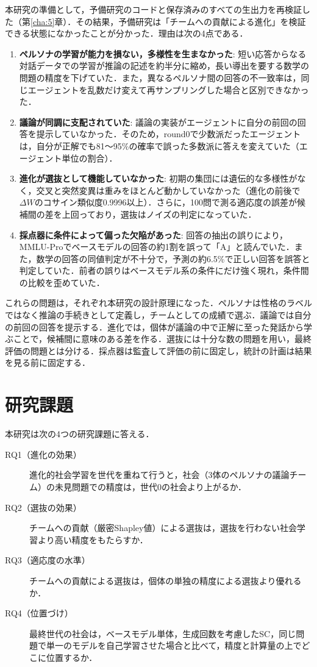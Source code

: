 本研究の準備として，予備研究のコードと保存済みのすべての生出力を再検証した（第\ref{cha:5}章）．その結果，予備研究は「チームへの貢献による進化」を検証できる状態になかったことが分かった．理由は次の4点である．
\begin{enumerate}
\item \textbf{ペルソナの学習が能力を損ない，多様性を生まなかった}: 短い応答からなる対話データでの学習が推論の記述を約半分に縮め，長い導出を要する数学の問題の精度を下げていた．また，異なるペルソナ間の回答の不一致率は，同じエージェントを乱数だけ変えて再サンプリングした場合と区別できなかった．
\item \textbf{議論が同調に支配されていた}: 議論の実装がエージェントに自分の前回の回答を提示していなかった．そのため，round0で少数派だったエージェントは，自分が正解でも81〜95\%の確率で誤った多数派に答えを変えていた（エージェント単位の割合）．
\item \textbf{進化が選抜として機能していなかった}: 初期の集団には遺伝的な多様性がなく，交叉と突然変異は重みをほとんど動かしていなかった（進化の前後で$\Delta W$のコサイン類似度0.9996以上）．さらに，100問で測る適応度の誤差が候補間の差を上回っており，選抜はノイズの判定になっていた．
\item \textbf{採点器に条件によって偏った欠陥があった}: 回答の抽出の誤りにより，MMLU-Proでベースモデルの回答の約1割を誤って「A」と読んでいた．また，数学の回答の同値判定が不十分で，予測の約6.5\%で正しい回答を誤答と判定していた．前者の誤りはベースモデル系の条件にだけ強く現れ，条件間の比較を歪めていた．
\end{enumerate}

これらの問題は，それぞれ本研究の設計原理になった．ペルソナは性格のラベルではなく推論の手続きとして定義し，チームとしての成績で選ぶ．議論では自分の前回の回答を提示する．進化では，個体が議論の中で正解に至った発話から学ぶことで，候補間に意味のある差を作る．選抜には十分な数の問題を用い，最終評価の問題とは分ける．採点器は監査して評価の前に固定し，統計の計画は結果を見る前に固定する．

\section{研究課題}
\label{sec:1.3}

本研究は次の4つの研究課題に答える．

\begin{description}
\item[RQ1（進化の効果）] 進化的社会学習を世代を重ねて行うと，社会（3体のペルソナの議論チーム）の未見問題での精度は，世代0の社会より上がるか．
\item[RQ2（選抜の効果）] チームへの貢献（厳密Shapley値）による選抜は，選抜を行わない社会学習より高い精度をもたらすか．
\item[RQ3（適応度の水準）] チームへの貢献による選抜は，個体の単独の精度による選抜より優れるか．
\item[RQ4（位置づけ）] 最終世代の社会は，ベースモデル単体，生成回数を考慮したSC，同じ問題で単一のモデルを自己学習させた場合と比べて，精度と計算量の上でどこに位置するか．
\end{description}

